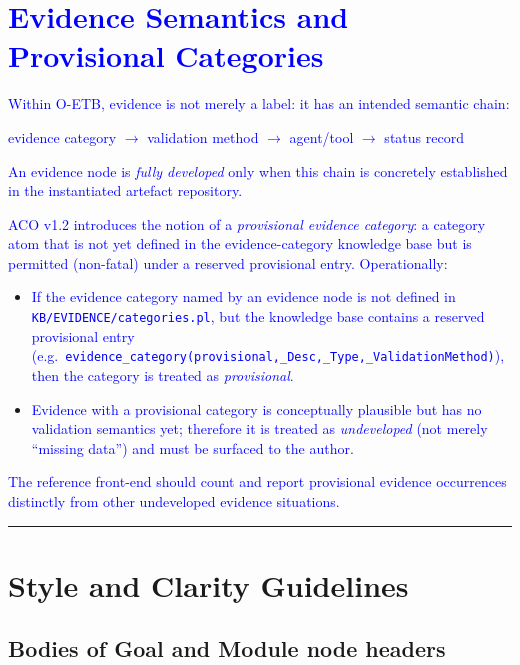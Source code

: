 \documentclass[11pt]{article}
\begin{document}
\section{\textcolor{blue}{Evidence Semantics and Provisional Categories}}

\textcolor{blue}{Within O-ETB, evidence is not merely a label: it has an intended semantic chain:}

\begin{center}
\textcolor{blue}{evidence category $\rightarrow$ validation method $\rightarrow$ agent/tool $\rightarrow$ status record}
\end{center}

\textcolor{blue}{An evidence node is \emph{fully developed} only when this chain is concretely established in the instantiated artefact repository.}

\textcolor{blue}{ACO v1.2 introduces the notion of a \emph{provisional evidence category}: a category atom that is not yet defined in the evidence-category knowledge base but is permitted (non-fatal) under a reserved provisional entry. Operationally:}
\begin{itemize}[leftmargin=2em]
  \item \textcolor{blue}{If the evidence category named by an evidence node is not defined in \texttt{KB/\allowbreak EVIDENCE/\allowbreak categories.pl}, but the knowledge base contains a reserved provisional entry (e.g.\ \texttt{evidence\_category(provisional,\_Desc,\allowbreak\_Type,\allowbreak\_ValidationMethod)}), then the category is treated as \emph{provisional}.}
  \item \textcolor{blue}{Evidence with a provisional category is conceptually plausible but has no validation semantics yet; therefore it is treated as \emph{undeveloped} (not merely ``missing data'') and must be surfaced to the author.}
\end{itemize}

\textcolor{blue}{The reference front-end should count and report provisional evidence occurrences distinctly from other undeveloped evidence situations.}



\bigskip
\hrule
\bigskip

\section{Style and Clarity Guidelines}

\subsection{Bodies of Goal and Module node headers}
\end{document}
